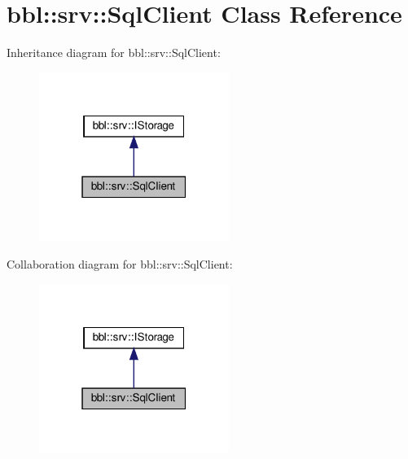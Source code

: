 \hypertarget{classbbl_1_1srv_1_1_sql_client}{}\section{bbl\+:\+:srv\+:\+:Sql\+Client Class Reference}
\label{classbbl_1_1srv_1_1_sql_client}


Inheritance diagram for bbl\+:\+:srv\+:\+:Sql\+Client\+:
\nopagebreak
\begin{figure}[H]
\begin{center}
\leavevmode
\includegraphics[width=175pt]{classbbl_1_1srv_1_1_sql_client__inherit__graph}
\end{center}
\end{figure}


Collaboration diagram for bbl\+:\+:srv\+:\+:Sql\+Client\+:
\nopagebreak
\begin{figure}[H]
\begin{center}
\leavevmode
\includegraphics[width=175pt]{classbbl_1_1srv_1_1_sql_client__coll__graph}
\end{center}
\end{figure}
